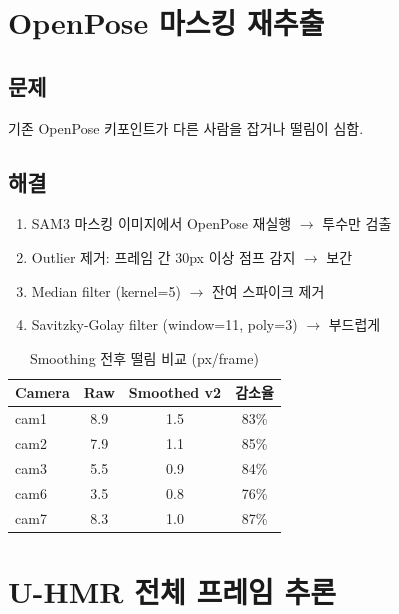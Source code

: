 \documentclass[11pt, a4paper]{report}
\begin{document}
\chapter{OpenPose 마스킹 재추출}

\section{문제}
기존 OpenPose 키포인트가 다른 사람을 잡거나 떨림이 심함.

\section{해결}
\begin{enumerate}[leftmargin=*]
  \item SAM3 마스킹 이미지에서 OpenPose 재실행 $\rightarrow$ 투수만 검출
  \item Outlier 제거: 프레임 간 30px 이상 점프 감지 $\rightarrow$ 보간
  \item Median filter (kernel=5) $\rightarrow$ 잔여 스파이크 제거
  \item Savitzky-Golay filter (window=11, poly=3) $\rightarrow$ 부드럽게
\end{enumerate}

\begin{table}[H]
\centering
\caption{Smoothing 전후 떨림 비교 (px/frame)}
\renewcommand{\arraystretch}{1.3}
\begin{tabular}{l ccc}
\toprule
\textbf{Camera} & \textbf{Raw} & \textbf{Smoothed v2} & \textbf{감소율} \\
\midrule
cam1 & 8.9 & 1.5 & 83\% \\
cam2 & 7.9 & 1.1 & 85\% \\
cam3 & 5.5 & 0.9 & 84\% \\
cam6 & 3.5 & 0.8 & 76\% \\
cam7 & 8.3 & 1.0 & 87\% \\
\bottomrule
\end{tabular}
\end{table}


\chapter{U-HMR 전체 프레임 추론}
\end{document}
